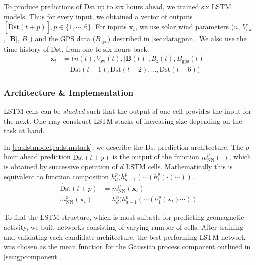 To produce predictions of Dst up to six hours ahead, we trained six LSTM models. 
Thus for every input, we obtained a vector of outputs 
$[\mathrm{\hat{D}st}\left(t + p\right)], p\in \{ 1, \cdots, 6 \}$.
%
For inputs $\mathbf{x}_t$, we use solar wind parameters 
($n$, $V_{\text{sw}}$, $|\mathbf{B}|$, $B_{z}$) and the GPS data ($B_{\text{gps}}$) described in 
\cref{sec:datagpnn}. We also use the time history of Dst, from one to six hours back.
%
\begin{equation}\label{eq:lstminputs}
	\begin{aligned}
		\mathbf{x}_t &= (n \left( t \right) , V_{\text{sw}}\left( t \right), 
		|\mathbf{B}\left( t \right)|, B_{z}\left( t \right) , B_{\text{gps}} \left( t \right),\\ 
		& \ \  \ \  \ \mathrm{Dst} \left( t-1 \right), \mathrm{Dst} \left( t-2 \right) , \ldots , 
		\mathrm{Dst} \left( t-6 \right) )
	\end{aligned}
\end{equation}

\subsubsection*{Architecture \& Implementation}

LSTM cells can be \emph{stacked} such that the output of one cell provides the input for the next. 
One may construct LSTM stacks of increasing size depending on the task at hand.  

In \cref{eq:dstmodel,eq:lstmstack}, we describe the Dst prediction architecture. The $p$ hour 
ahead prediction $\mathrm{\hat{D}st} \left(t + p \right)$ is the output of the function 
$m^{p}_{\text{NN}}(\cdot)$, which is obtained by successive operation of $d$ LSTM cells. 
Mathematically this is equivalent to function composition 
$h^{p}_{d} ( h^{p}_{d-1}( \cdots (h^{p}_{1}(\cdot)\cdots))$.
%
\begin{align}
	\mathrm{\hat{D}st} \left(t + p \right) &= 
	m^{p}_{\text{NN}} (\mathbf{x}_t) \label{eq:dstmodel}\\
	m^{p}_{\text{NN}} (\mathbf{x}_t) &= 
	h^{p}_{d} ( h^{p}_{d-1}( \cdots (h^{p}_{1}(\mathbf{x}_t)\cdots)) \label{eq:lstmstack}
\end{align}

To find the LSTM structure, which is most suitable for predicting geomagnetic activity, we 
built networks consisting of varying number of cells. After training and validating each candidate 
architecture, the best performing LSTM network was chosen as the mean function for the Gaussian 
process component outlined in \cref{sec:gpcomponent}.

